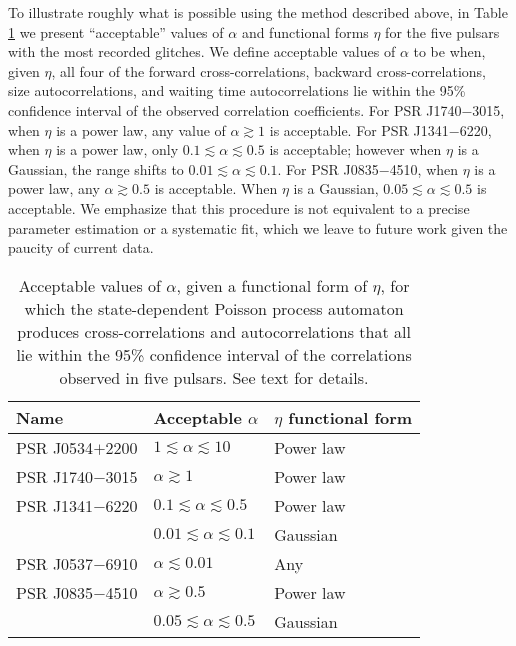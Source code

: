 To illustrate roughly what is possible using the method described above, in Table \ref{tab:params} we present ``acceptable'' values of $\alpha$ and functional forms $\eta$ for the five pulsars with the most recorded glitches. We define acceptable values of $\alpha$ to be when, given $\eta$, all four of the forward cross-correlations, backward cross-correlations, size autocorrelations, and waiting time autocorrelations lie within the 95\% confidence interval of the observed correlation coefficients. For PSR J1740$-$3015, when $\eta$ is a power law, any value of $\alpha \gtrsim 1$ is acceptable. For PSR J1341$-$6220, when $\eta$ is a power law, only $0.1 \lesssim \alpha \lesssim 0.5$ is acceptable; however when $\eta$ is a Gaussian, the range shifts to $0.01 \lesssim \alpha \lesssim 0.1$. For PSR J0835$-$4510, when $\eta$ is a power law, any $\alpha \gtrsim 0.5$ is acceptable. When $\eta$ is a Gaussian, $0.05 \lesssim \alpha \lesssim 0.5$ is acceptable. We emphasize that this procedure is not equivalent to a precise parameter estimation or a systematic fit, which we leave to future work given the paucity of current data.

\begin{table}
	\centering %
	\caption{Acceptable values of $\alpha$, given a functional form of $\eta$, for which the state-dependent Poisson process automaton produces cross-correlations and autocorrelations that all lie within the 95\% confidence interval of the correlations observed in five pulsars. See text for details.}
	\begin{tabular}{l l l}
	\toprule
	Name & {Acceptable $\alpha$} & {$\eta$ functional form} \\
	\midrule
	PSR J0534$+$2200  & $1 \lesssim \alpha \lesssim 10$ 	& Power law \\
	PSR J1740$-$3015  & $ \alpha \gtrsim 1$ 				& Power law \\
	PSR J1341$-$6220  & $0.1 \lesssim \alpha \lesssim 0.5$  & Power law \\
		  			  & $0.01 \lesssim \alpha \lesssim 0.1$ & Gaussian \\
	PSR J0537$-$6910  & $\alpha \lesssim 0.01$ 				& Any \\
	PSR J0835$-$4510  & $\alpha \gtrsim 0.5$ 				& Power law \\
		 			  & $0.05 \lesssim \alpha \lesssim 0.5$ & Gaussian \\
	\bottomrule
	\end{tabular}
	\label{tab:params}
\end{table}

